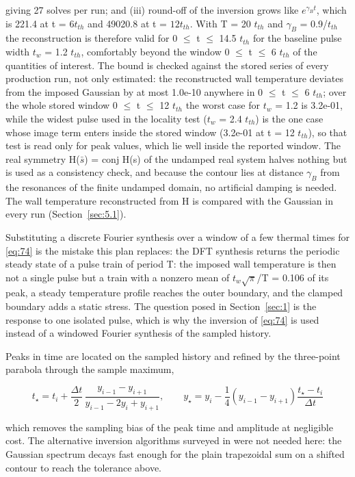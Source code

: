 \documentclass[preprint,12pt]{elsarticle}
\begin{document}
giving 27 solves per run; and (iii) round-off of the inversion grows like $e^{\gamma_{B}t}$, which is 221.4 at t = $6t_{th}$ and 49020.8 at t = $12t_{th}$. With T = 20 $t_{th}$ and $\gamma_{B}$ = 0.9/$t_{th}$ the reconstruction is therefore valid for 0 $\leq$ t $\leq$ 14.5 $t_{th}$ for the baseline pulse width $t_{w}$ = 1.2 $t_{th}$, comfortably beyond the window 0 $\leq$ t $\leq$ 6 $t_{th}$ of the quantities of interest. The bound is checked against the stored series of every production run, not only estimated: the reconstructed wall temperature deviates from the imposed Gaussian by at most 1.0e-10 anywhere in 0 $\leq$ t $\leq$ 6 $t_{th}$; over the whole stored window 0 $\leq$ t $\leq$ 12 $t_{th}$ the worst case for $t_{w}$ = 1.2 is 3.2e-01, while the widest pulse used in the locality test ($t_{w}$ = 2.4 $t_{th}$) is the one case whose image term enters inside the stored window (3.2e-01 at t = 12 $t_{th}$), so that test is read only for peak values, which lie well inside the reported window. The real symmetry H($\bar{s}$) = conj H(s) of the undamped real system halves nothing but is used as a consistency check, and because the contour lies at distance $\gamma_{B}$ from the resonances of the finite undamped domain, no artificial damping is needed. The wall temperature reconstructed from H is compared with the Gaussian in every run (Section~\ref{sec:5.1}).

Substituting a discrete Fourier synthesis over a window of a few thermal times for \eqref{eq:74} is the mistake this plan replaces: the DFT synthesis returns the periodic steady state of a pulse train of period T: the imposed wall temperature is then not a single pulse but a train with a nonzero mean of $t_{w}\sqrt \pi$/T = 0.106 of its peak, a steady temperature profile reaches the outer boundary, and the clamped boundary adds a static stress. The question posed in Section~\ref{sec:1} is the response to one isolated pulse, which is why the inversion of \eqref{eq:74} is used instead of a windowed Fourier synthesis of the sampled history.

Peaks in time are located on the sampled history and refined by the three-point parabola through the sample maximum,

\begin{equation}
t_\star=t_i+\frac{\Delta t}{2}\,\frac{y_{i-1}-y_{i+1}}{y_{i-1}-2y_i+y_{i+1}},\qquad y_\star=y_i-\frac{1}{4}\left(y_{i-1}-y_{i+1}\right)\frac{t_\star-t_i}{\Delta t} 
\label{eq:76}
\end{equation}

which removes the sampling bias of the peak time and amplitude at negligible cost. The alternative inversion algorithms surveyed in \cite{davies1979,weeks1966,talbot1979,abate2006,dehoog1982} were not needed here: the Gaussian spectrum decays fast enough for the plain trapezoidal sum on a shifted contour to reach the tolerance above.
\end{document}

